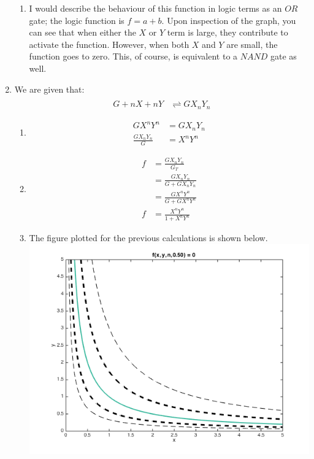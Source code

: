 \documentclass[10pt]{article}
\begin{document}
\begin{enumerate}
\begin{enumerate}
\item I would describe the behaviour of this function in logic terms as an $OR$ gate; the logic function is $f = a + b$. Upon inspection of the graph, you can see that when either the $X$ or $Y$ term is large, they contribute to activate the function. However, when both $X$ and $Y$ are small, the function goes to zero. This, of course, is equivalent to a $NAND$ gate as well.
\end{enumerate}


\item We are given that: \begin{align*} \\ G + nX + nY &\rightleftharpoons GX_nY_n \end{align*}
\begin{enumerate}
\item \begin{align*} GX^nY^n &= G X_n Y_n \\ \frac{GX_nY_n}{G} &= X^nY^n \end{align*}
\item \begin{align*} f &= \frac {GX_nY_n}{G_T} \\ &= \frac {GX_nY_n}{G + GX_nY_n} \\ &= \frac {GX^nY^n}{G + GX^nY^n} \\ f &= \frac{X^nY^n}{1 + X^nY^n} \end{align*}
\item The figure plotted for the previous calculations is shown below.\\ \includegraphics[scale=0.4]{hw11q2c.png}

\end{enumerate}
\end{enumerate}
\end{document}
